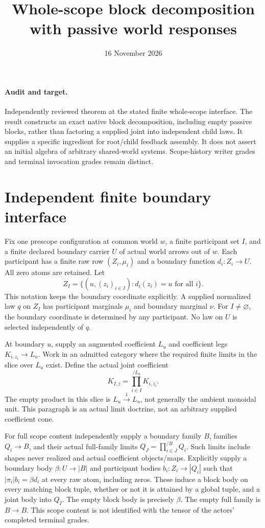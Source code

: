 \documentclass[11pt]{article}
\title{Whole-scope block decomposition with passive world responses}
\date{16 November 2026}
\begin{document}
\maketitle
\paragraph{Audit and target.} Independently reviewed theorem at the stated finite whole-scope interface. The result constructs an exact native block decomposition, including empty passive blocks, rather than factoring a supplied joint into independent child laws. It supplies a specific ingredient for root/child feedback assembly. It does not assert an initial algebra of arbitrary shared-world systems. Scope-history writer grades and terminal invocation grades remain distinct.

\section{Independent finite boundary interface}
Fix one prescope configuration at common world $w$, a finite participant set $I$, and a finite declared boundary carrier $U$ of actual world arrows out of $w$. Each participant has a finite raw row $(Z_i,\mu_i)$ and a boundary function $d_i:Z_i\to U$. All zero atoms are retained. Let
\[
 Z_I=\{(u,(z_i)_{i\in I}):d_i(z_i)=u\text{ for all }i\}.
\]
This notation keeps the boundary coordinate explicitly. A supplied normalized law $q$ on $Z_I$ has participant marginals $\mu_i$ and boundary marginal $\nu$. For $I\ne\varnothing$, the boundary coordinate is determined by any participant. No law on $U$ is selected independently of $q$.

At boundary $u$, supply an augmented coefficient $L_u$ and coefficient legs $K_{i,z_i}\to L_u$. Work in an admitted category where the required finite limits in the slice over $L_u$ exist. Define the actual joint coefficient
\[
 K_{I,z}=\prod_{i\in I}^{/L_u}K_{i,z_i}.
\]
The empty product in this slice is $L_u\xrightarrow{1}L_u$, not generally the ambient monoidal unit. This paragraph is an actual limit doctrine, not an arbitrary supplied coefficient cone.

For full scope content independently supply a boundary family $B$, families $Q_i\to B$, and their actual full-family limits $Q_J=\prod_{i\in J}^{/B}Q_i$. Such limits include shapes never realized and actual coefficient objects/maps. Explicitly supply a boundary body $\beta:U\to|B|$ and participant bodies $b_i:Z_i\to|Q_i|$ such that $|\pi_i|b_i=\beta d_i$ at every raw atom, including zeros. These induce a block body on every matching block tuple, whether or not it is attained by a global tuple, and a joint body into $Q_I$. The empty block body is precisely $\beta$. The empty full family is $B\to B$. This scope content is not identified with the tensor of the actors' completed terminal grades.
\end{document}
